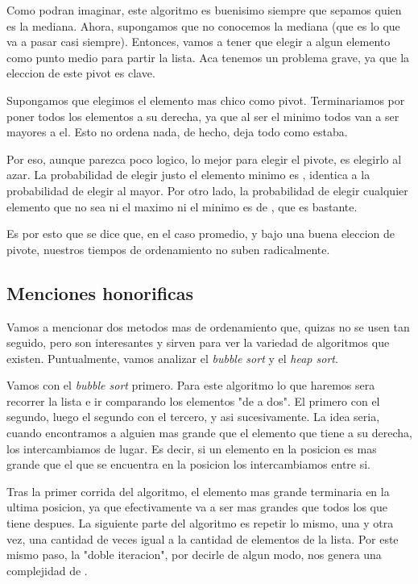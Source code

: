 \documentclass{article}
\begin{document}
Como podran imaginar, este algoritmo es buenisimo siempre que sepamos quien es la mediana. Ahora, supongamos que no conocemos la mediana (que es lo que va a pasar casi siempre). Entonces, vamos a tener que elegir a algun elemento como punto medio para partir la lista. Aca tenemos un problema grave, ya que la eleccion de este pivot es clave. 

Supongamos que elegimos el elemento mas chico como pivot. Terminariamos por poner todos los elementos a su derecha, ya que al ser el minimo todos van a ser mayores a el. Esto no ordena nada, de hecho, deja todo como estaba.

Por eso, aunque parezca poco logico, lo mejor para elegir el pivote, es elegirlo al azar. La probabilidad de elegir justo el elemento minimo es , identica a la probabilidad de elegir al mayor. Por otro lado, la probabilidad de elegir cualquier elemento que no sea ni el maximo ni el minimo es de , que es bastante.

Es por esto que se dice que, en el caso promedio, y bajo una buena eleccion de pivote, nuestros tiempos de ordenamiento no suben radicalmente.

\subsection{Menciones honorificas}
Vamos a mencionar dos metodos mas de ordenamiento que, quizas no se usen tan seguido, pero son interesantes y sirven para ver la variedad de algoritmos que existen. Puntualmente, vamos analizar el \textit{bubble sort} y el \textit{heap sort}.

Vamos con el \textit{bubble sort} primero. Para este algoritmo lo que haremos sera recorrer la lista e ir comparando los elementos "de a dos". El primero con el segundo, luego el segundo con el tercero, y asi sucesivamente. La idea seria, cuando encontramos a alguien mas grande que el elemento que tiene a su derecha, los intercambiamos de lugar. Es decir, si un elemento en la posicion  es mas grande que el que se encuentra en la posicion  los intercambiamos entre si.

Tras la primer corrida del algoritmo, el elemento mas grande terminaria en la ultima posicion, ya que efectivamente va a ser mas grandes que todos los que tiene despues. La siguiente parte del algoritmo es repetir lo mismo, una y otra vez, una cantidad de veces igual a la cantidad de elementos de la lista. Por este mismo paso, la "doble iteracion", por decirle de algun modo, nos genera una complejidad de .
\end{document}
